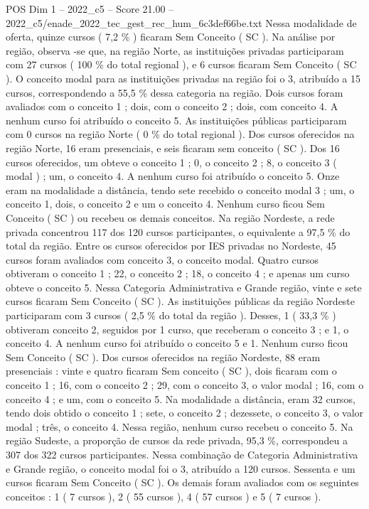 \begin{textsample}{POS Dim 1 – 2022\_c5 – Score 21.00 – 2022\_c5/enade\_2022\_tec\_gest\_rec\_hum\_6c3def66be.txt}
Nessa modalidade de oferta, quinze cursos ( 7,2 \% ) ficaram Sem Conceito ( SC ).
Na análise por região, observa -se que, na região Norte, as instituições privadas participaram com 27 cursos ( 100 \% do total regional ), e 6 cursos ficaram Sem Conceito ( SC ).
O conceito modal para as instituições privadas na região foi o 3, atribuído a 15 cursos, correspondendo a 55,5 \% dessa categoria na região.
Dois cursos foram avaliados com o conceito 1 ; dois, com o conceito 2 ; dois, com conceito 4.
A nenhum curso foi atribuído o conceito 5.
As instituições públicas participaram com 0 cursos na região Norte ( 0 \% do total regional ).
Dos cursos oferecidos na região Norte, 16 eram presenciais, e seis ficaram sem conceito ( SC ).
Dos 16 cursos oferecidos, um obteve o conceito 1 ; 0, o conceito 2 ; 8, o conceito 3 ( modal ) ; um, o conceito 4.
A nenhum curso foi atribuído o conceito 5.
Onze eram na modalidade a distância, tendo sete recebido o conceito modal 3 ; um, o conceito 1, dois, o conceito 2 e um o conceito 4.
Nenhum curso ficou Sem Conceito ( SC ) ou recebeu os demais conceitos.
Na região Nordeste, a rede privada concentrou 117 dos 120 cursos participantes, o equivalente a 97,5 \% do total da região.
Entre os cursos oferecidos por IES privadas no Nordeste, 45 cursos foram avaliados com conceito 3, o conceito modal.
Quatro cursos obtiveram o conceito 1 ; 22, o conceito 2 ; 18, o conceito 4 ; e apenas um curso obteve o conceito 5.
Nessa Categoria Administrativa e Grande região, vinte e sete cursos ficaram Sem Conceito ( SC ).
As instituições públicas da região Nordeste participaram com 3 cursos ( 2,5 \% do total da região ).
Desses, 1 ( 33,3 \% ) obtiveram conceito 2, seguidos por 1 curso, que receberam o conceito 3 ; e 1, o conceito 4.
A nenhum curso foi atribuído o conceito 5 e 1.
Nenhum curso ficou Sem Conceito ( SC ).
Dos cursos oferecidos na região Nordeste, 88 eram presenciais : vinte e quatro ficaram Sem conceito ( SC ), dois ficaram com o conceito 1 ; 16, com o conceito 2 ; 29, com o conceito 3, o valor modal ; 16, com o conceito 4 ; e um, com o conceito 5.
Na modalidade a distância, eram 32 cursos, tendo dois obtido o conceito 1 ; sete, o conceito 2 ; dezessete, o conceito 3, o valor modal ; três, o conceito 4.
Nessa região, nenhum curso recebeu o conceito 5.
Na região Sudeste, a proporção de cursos da rede privada, 95,3 \%, correspondeu a 307 dos 322 cursos participantes.
Nessa combinação de Categoria Administrativa e Grande região, o conceito modal foi o 3, atribuído a 120 cursos.
Sessenta e um cursos ficaram Sem Conceito ( SC ).
Os demais foram avaliados com os seguintes conceitos : 1 ( 7 cursos ), 2 ( 55 cursos ), 4 ( 57 cursos ) e 5 ( 7 cursos ).

\end{textsample}
